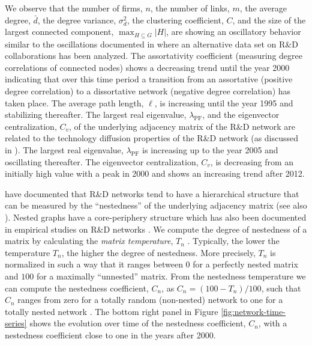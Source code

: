 We observe that the number of firms, $n$, the number of links, $m$, the average degree, $\bar{d}$, the degree variance, $\sigma_d^2$, the clustering coefficient, $C$, and the size of the largest connected component, $\max_{H \subseteq G} |H|$, are showing an oscillatory behavior similar to the oscillations documented in \citet{Konig2016a} where an alternative data set on R\&D collaborations has been analyzed. The assortativity coefficient (measuring degree correlations of connected nodes) shows a decreasing trend until the year 2000 indicating that over this time period a transition from an assortative (positive degree correlation) to a dissortative network (negative degree correlation) has taken place. The average path length, $\ell$, is increasing until the year 1995 and stabilizing thereafter. The largest real eigenvalue, $\lambda_{\text{PF}}$, and the eigenvector centralization, $C_v$, of the underlying adjacency matrix of the R\&D network are related to the technology diffusion properties of the R\&D network (as discussed in \citet{koenig09:_effic_and_stabil_of_r_d_networ}). The largest real eigenvalue, $\lambda_{\text{PF}}$ is increasing up to the year 2005 and oscillating thereafter. The eigenvector centralization, $C_v$, is decreasing from an initially high value with a peak in 2000 and shows an increasing trend after 2012.

\citet{Konig2012a} have documented that R\&D networks tend to have a hierarchical structure that can be measured by the ``nestedness'' of the underlying adjacency matrix (see also \citet{Koenig2011}). Nested graphs have a
core-periphery structure
which has also been documented in empirical studies on R\&D networks \citep{Kitsak2010, rosenkopf07:_compar_allian_networ_struc_acros_indus}. We compute the degree of nestedness of a matrix by calculating the \emph{matrix temperature}, $T_n$ \citep{Atmar1993}. Typically, the lower the temperature $T_n$, the higher the degree of nestedness. More precisely, $T_n$ is normalized in such a way that it ranges between $0$ for a perfectly nested matrix and $100$ for a maximally ``unnested'' matrix. From the nestedness temperature we can compute the nestedness coefficient, $C_n$, as $C_n = (100-T_n)/100$, such that $C_n$ ranges from zero for a totally random (non-nested) network to one for a totally nested network \citep{AlmeidaNeto2008}. The bottom right panel in Figure \ref{fig:network-time-series} shows the evolution over time of the nestedness coefficient, $C_n$, with a nestedness coefficient close to one in the years after 2000. 

